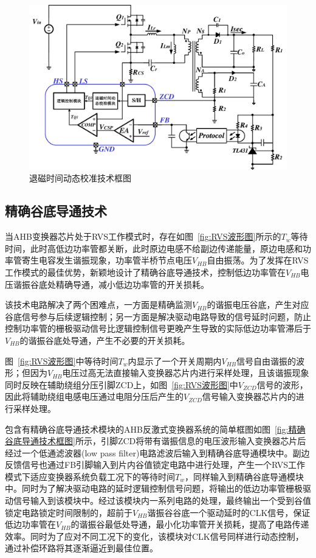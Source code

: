 \begin{figure}[htbp] 
    \centering
    \includegraphics[width=0.8\linewidth]{figures/退磁时间动态校准图.pdf}
    \caption{退磁时间动态校准技术框图}
    \label{fig:退磁时间1}
\end{figure}


\subsection{精确谷底导通技术}
当AHB变换器芯片处于RVS工作模式时，存在如图~\ref{fig:RVS波形图}所示的$T_w$等待时间，此时高低边功率管都关断，此时原边电感不给副边传递能量，原边电感和功率管寄生电容发生谐振现象，功率管半桥节点电压$V_{HB}$自由振荡。为了发挥在RVS工作模式的最佳优势，新颖地设计了精确谷底导通技术，控制低边功率管在$V_{HB}$电压谐振谷底处精确导通，减小低边功率管的开关损耗。

该技术电路解决了两个困难点，一方面是精确监测$V_{HB}$的谐振电压谷底，产生对应谷底信号参与后续逻辑控制；另一方面是解决驱动电路导致的信号延时问题，防止控制功率管的栅极驱动信号比逻辑控制信号更晚产生导致的实际低边功率管滞后于$V_{HB}$的谐振谷底处导通，产生不必要的开关损耗。

图~\ref{fig:RVS波形图}中等待时间$T_w$内显示了一个开关周期内$V_{HB}$信号自由谐振的波形；但因为$V_{HB}$电压过高无法直接输入变换器芯片内进行采样处理，且该谐振现象同时反映在辅助绕组分压引脚ZCD上，如图~\ref{fig:RVS波形图}中$V_{ZCD}$信号的波形，因此将辅助绕组电感电压通过电阻分压后产生的$V_{ZCD}$信号输入变换器芯片内的进行采样处理。

包含有精确谷底导通技术模块的AHB反激式变换器系统的简单框图如图~\ref{fig:精确谷底导通技术框图}所示，引脚ZCD将带有谐振信息的电压波形输入变换器芯片后经过一个低通滤波器(low pass filter)电路滤波后输入到精确谷底导通模块中。副边反馈信号也通过FB引脚输入到片内谷值锁定电路中进行处理，产生一个RVS工作模式下适应变换器系统负载工况下的等待时间$T_w$，同样输入到精确谷底导通模块中。同时为了解决驱动电路的延时逻辑控制信号问题，将输出的低边功率管栅极驱动信号输入到该模块中。经过该模块内一系列电路的处理，最终输出一个受到谷值锁定电路锁定时间限制的，超前于$V_{HB}$谐振谷谷底一个驱动延时的CLK信号，保证低边功率管在$V_{HB}$的谐振谷最低处导通，最小化功率管开关损耗，提高了电路传递效率。同时为了应对不同工况下的变化，该模块对CLK信号同样进行动态控制，通过补偿环路将其逐渐逼近到最佳位置。

